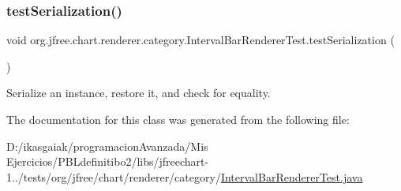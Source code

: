 \subsubsection{\texorpdfstring{test\+Serialization()}{testSerialization()}}
{\footnotesize\ttfamily void org.\+jfree.\+chart.\+renderer.\+category.\+Interval\+Bar\+Renderer\+Test.\+test\+Serialization (\begin{DoxyParamCaption}{ }\end{DoxyParamCaption})}

Serialize an instance, restore it, and check for equality. 

The documentation for this class was generated from the following file\+:\begin{DoxyCompactItemize}
\item 
D\+:/ikasgaiak/programacion\+Avanzada/\+Mis Ejercicios/\+P\+B\+Ldefinitibo2/libs/jfreechart-\/1../tests/org/jfree/chart/renderer/category/\mbox{\hyperlink{_interval_bar_renderer_test_8java}{Interval\+Bar\+Renderer\+Test.\+java}}\end{DoxyCompactItemize}
